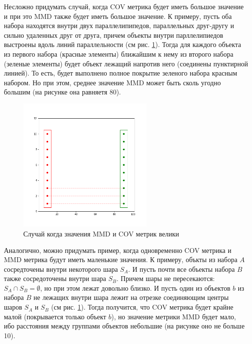 Несложно придумать случай, когда COV метрика будет иметь большое значение и при это MMD также будет иметь большое значение. К примеру, пусть оба набора находятся внутри двух параллелипипедов, параллельных друг-другу и сильно удаленных друг от друга, причем объекты внутри парллелипиедов выстроены вдоль линий параллельности (см рис. \ref{fig:mmdcov1}). Тогда для каждого объекта из первого набора (красные элементы) ближайшим к нему из второго набора (зеленые элементы) будет объект лежащий напротив него (соединены пунктирной линией). То есть, будет выполнено полное покрытие зеленого набора красным набором. Но при этом, среднее значение MMD может быть сколь угодно большим (на рисунке она равняетя 80).

\begin{figure}[h]
\centering
    \includegraphics[width=0.6\textwidth]{images/MMD-COV-problem-1.png}
    \caption{Случай когда значения MMD и COV метрик велики}
    \label{fig:mmdcov1}
\end{figure}


Аналогично, можно придумать пример, когда одновременно COV метрика и MMD метрика будут иметь маленькие значения.
К примеру, объкты из набора $A$ сосредточены внутри некоторого шара $S_{A}$. И пусть почти все объекты набора $B$ также сосредоточены внутри шара $S_{B}$. Причем шары не пересекаются: $S_{A} \cap S_{B} = \emptyset$, но при этом лежат довольно близко. И пусть один из объектов $b$ из набора $B$ не лежащих внутри шара лежит на отрезке соединяющим центры шаров $S_{A}$ и $S_{B}$ (см рис. \ref{fig:mmdcov1}).
Тогда получится, что COV метрика будет крайне малой (покрывается только объект $b$), но значение метрики MMD будет мало, ибо расстояния между группами объектов небольшие (на рисунке оно не больше 10).

